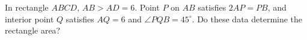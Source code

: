 In rectangle $ABCD$, $AB>AD=6$. Point $P$ on $AB$ satisfies $2AP=PB$, and interior point $Q$ satisfies $AQ=6$ and $\angle PQB=45^\circ$. Do these data determine the rectangle area?
